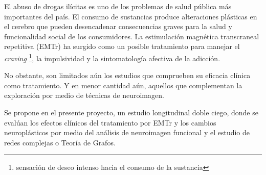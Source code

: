 El abuso de drogas ilícitas es uno de los problemas de salud pública más
importantes del país. El consumo de sustancias produce alteraciones plásticas en el
cerebro que pueden desencadenar consecuencias graves para la salud y funcionalidad
social de los consumidores. La estimulación magnética transcraneal repetitiva
(EMTr) ha surgido como un posible tratamiento para manejar el \textit{craving}
\footnote{sensación de deseo intenso hacia el consumo de la sustancia},
la impulsividad y la sintomatología afectiva de la adicción. \par
No obstante, son limitados aún los estudios que comprueben su eficacia clínica
como tratamiento. Y en menor cantidad aún, aquellos que complementan la exploración
 por medio de técnicas de neuroimagen. \par
Se propone en el presente proyecto, un estudio longitudinal
doble ciego, donde se evalúan los efectos clínicos del tratamiento por EMTr y los
cambios neuroplásticos por medio del análisis de neuroimagen funcional y el estudio
de redes complejas o Teoría de Grafos.
